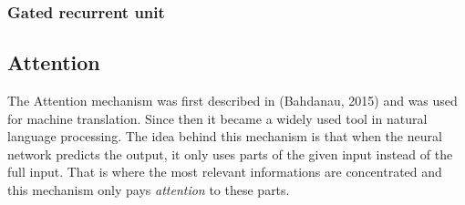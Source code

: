\subsubsection{Gated recurrent unit}
\subsection{Attention}
The Attention mechanism was first described in (Bahdanau, 2015) and was used for machine translation. Since then it became a widely used tool in natural language processing. The idea behind this mechanism is that when the neural network predicts the output, it only uses parts of the given input instead of the full input. That is where the most relevant informations are concentrated and this mechanism only pays \textit{attention} to these parts.